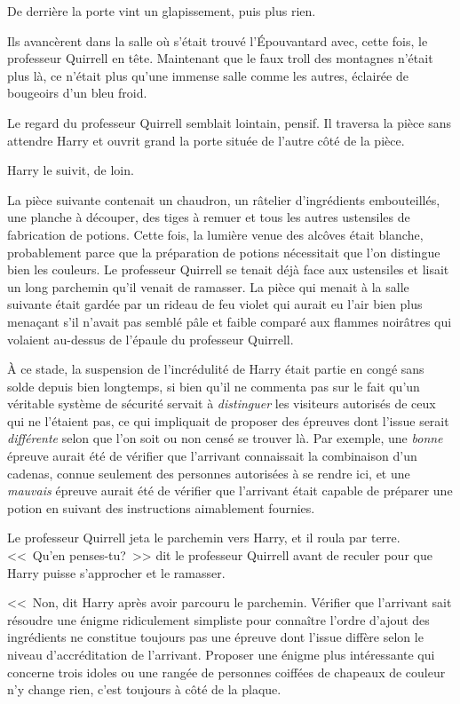 De derrière la porte vint un glapissement, puis plus rien.

Ils avancèrent dans la salle où s'était trouvé l'Épouvantard avec, cette fois, le professeur Quirrell en tête. Maintenant que le faux troll des montagnes n'était plus là, ce n'était plus qu'une immense salle comme les autres, éclairée de bougeoirs d'un bleu froid.

Le regard du professeur Quirrell semblait lointain, pensif. Il traversa la pièce sans attendre Harry et ouvrit grand la porte située de l'autre côté de la pièce.

Harry le suivit, de loin.

\later

La pièce suivante contenait un chaudron, un râtelier d'ingrédients embouteillés, une planche à découper, des tiges à remuer et tous les autres ustensiles de fabrication de potions. Cette fois, la lumière venue des alcôves était blanche, probablement parce que la préparation de potions nécessitait que l'on distingue bien les couleurs. Le professeur Quirrell se tenait déjà face aux ustensiles et lisait un long parchemin qu'il venait de ramasser. La pièce qui menait à la salle suivante était gardée par un rideau de feu violet qui aurait eu l'air bien plus menaçant s'il n'avait pas semblé pâle et faible comparé aux flammes noirâtres qui volaient au-dessus de l'épaule du professeur Quirrell.

À ce stade, la suspension de l'incrédulité de Harry était partie en congé sans solde depuis bien longtemps, si bien qu'il ne commenta pas sur le fait qu'un véritable système de sécurité servait à \emph{distinguer} les visiteurs autorisés de ceux qui ne l'étaient pas, ce qui impliquait de proposer des épreuves dont l'issue serait \emph{différente} selon que l'on soit ou non censé se trouver là. Par exemple, une \emph{bonne} épreuve aurait été de vérifier que l'arrivant connaissait la combinaison d'un cadenas, connue seulement des personnes autorisées à se rendre ici, et une \emph{mauvais} épreuve aurait été de vérifier que l'arrivant était capable de préparer une potion en suivant des instructions aimablement fournies.

Le professeur Quirrell jeta le parchemin vers Harry, et il roula par terre. <<~Qu'en penses-tu?~>> dit le professeur Quirrell avant de reculer pour que Harry puisse s'approcher et le ramasser.

<<~Non, dit Harry après avoir parcouru le parchemin. Vérifier que l'arrivant sait résoudre une énigme ridiculement simpliste pour connaître l'ordre d'ajout des ingrédients ne constitue toujours pas une épreuve dont l'issue diffère selon le niveau d'accréditation de l'arrivant. Proposer une énigme plus intéressante qui concerne trois idoles ou une rangée de personnes coiffées de chapeaux de couleur n'y change rien, c'est toujours à côté de la plaque.

